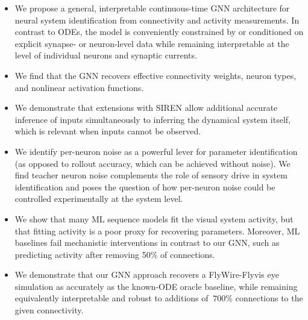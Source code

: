 \documentclass{article}
\begin{document}
\begin{itemize}
    \item We propose a general, interpretable continuous-time GNN architecture for neural system identification from connectivity and activity measurements. In contrast to ODEs, the model is conveniently constrained by or conditioned on explicit synapse- or neuron-level data while remaining interpretable at the level of individual neurons and synaptic currents.
    \item We find that the GNN recovers effective connectivity weights, neuron types, and nonlinear activation functions. %
    \item We demonstrate that extensions with SIREN \citep{Siren} allow additional accurate inference of inputs simultaneously to inferring the dynamical system itself, which is relevant when inputs cannot be observed.
    \item We identify per-neuron noise as a powerful lever for parameter identification (as opposed to rollout accuracy, which can be achieved without noise). We find teacher neuron noise complements the role of sensory drive in system identification and poses the question of how per-neuron noise could be controlled experimentally at the system level.
    \item We show that many ML sequence models fit the visual system activity, but that fitting activity is a poor proxy for recovering parameters. Moreover, ML baselines fail mechanistic interventions in contrast to our GNN, such as predicting activity after removing 50\% of connections.
    \item We demonstrate that our GNN approach recovers a FlyWire-Flyvis eye simulation as accurately as the known-ODE oracle baseline, while remaining equivalently interpretable and robust to additions of $~700\%$ connections to the given connectivity.
\end{itemize}


\end{document}
